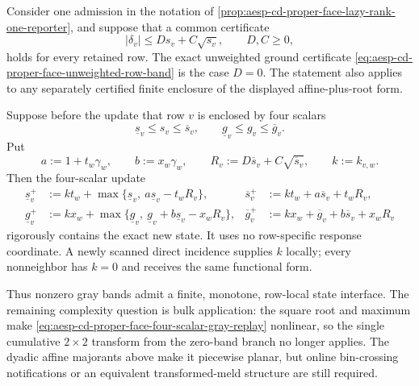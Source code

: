 \begin{proposition}
\label{prop:aesp-cd-proper-face-four-scalar-gray-replay}
Consider one admission in the notation of
\cref{prop:aesp-cd-proper-face-lazy-rank-one-reporter}, and suppose that a
common certificate
\begin{equation}
 |\delta_v|\leq D s_v+C\sqrt{s_v},
 \qquad D,C\geq0,
 \label{eq:aesp-cd-proper-face-common-root-delta}
\end{equation}
holds for every retained row.  The exact unweighted ground certificate
\cref{eq:aesp-cd-proper-face-unweighted-row-band} is the case \(D=0\).
The statement also applies to any separately certified finite enclosure of
the displayed affine-plus-root form.

Suppose before the update that row \(v\) is enclosed by four scalars
\begin{equation*}
 \underline s_v\leq s_v\leq\overline s_v,
 \qquad
 \underline g_v\leq g_v\leq\overline g_v.
\end{equation*}
Put
\begin{equation*}
 a:=1+t_w\gamma_w,\qquad b:=x_w\gamma_w,\qquad
 R_v:=D\overline s_v+C\sqrt{\overline s_v},\qquad k:=k_{v,w}.
\end{equation*}
Then the four-scalar update
\begin{align}
 \underline s_v^+
 &:=kt_w+
   \max\{\underline s_v,\ a\underline s_v-t_wR_v\},&
 \overline s_v^+
 &:=kt_w+a\overline s_v+t_wR_v,\nonumber\\
 \underline g_v^+
 &:=kx_w+
   \max\{\underline g_v,\
          \underline g_v+b\underline s_v-x_wR_v\},&
 \overline g_v^+
 &:=kx_w+\overline g_v+b\overline s_v+x_wR_v
 \label{eq:aesp-cd-proper-face-four-scalar-gray-replay}
\end{align}
rigorously contains the exact new state.  It uses no row-specific response
coordinate.  A newly scanned direct incidence supplies \(k\) locally; every
nonneighbor has \(k=0\) and receives the same functional form.

Thus nonzero gray bands admit a finite, monotone, row-local state interface.
The remaining complexity question is bulk application: the square root and
maximum make
\cref{eq:aesp-cd-proper-face-four-scalar-gray-replay} nonlinear, so the
single cumulative \(2\times2\) transform from the zero-band branch no longer
applies.  The dyadic affine majorants above make it piecewise planar, but
online bin-crossing notifications or an equivalent transformed-meld
structure are still required.
\end{proposition}

